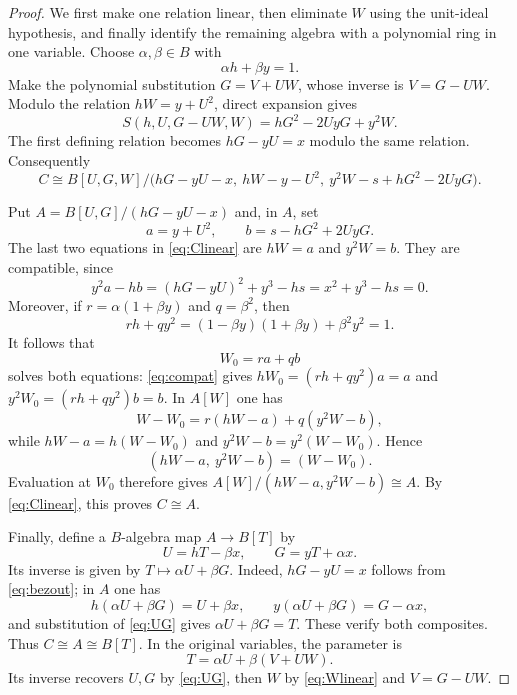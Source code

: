 \documentclass[11pt]{article}
\numberwithin{equation}{section}
\begin{document}
\begin{proof}
We first make one relation linear, then eliminate $W$ using the unit-ideal
hypothesis, and finally identify the remaining algebra with a polynomial ring
in one variable.
Choose $\alpha,\beta\in B$ with
\begin{equation}
  \alpha h+\beta y=1. \label{eq:bezout}
\end{equation}
Make the polynomial substitution $G=V+UW$, whose inverse is $V=G-UW$.
Modulo the relation $hW=y+U^2$, direct expansion gives
\[
  S(h,U,G-UW,W)=hG^2-2UyG+y^2W.
\]
The first defining relation becomes $hG-yU=x$ modulo the same relation.
Consequently
\begin{equation}
  C\cong B[U,G,W]/\bigl(hG-yU-x,\ hW-y-U^2,\
                       y^2W-s+hG^2-2UyG\bigr). \label{eq:Clinear}
\end{equation}

Put $A=B[U,G]/(hG-yU-x)$ and, in $A$, set
\[
  a=y+U^2,\qquad b=s-hG^2+2UyG.
\]
The last two equations in \eqref{eq:Clinear} are $hW=a$ and $y^2W=b$.
They are compatible, since
\begin{equation}
  y^2a-hb=(hG-yU)^2+y^3-hs=x^2+y^3-hs=0. \label{eq:compat}
\end{equation}
Moreover, if $r=\alpha(1+\beta y)$ and $q=\beta^2$, then
\[
  rh+qy^2=(1-\beta y)(1+\beta y)+\beta^2y^2=1.
\]
It follows that
\begin{equation}
  W_0=ra+qb \label{eq:Wlinear}
\end{equation}
solves both equations: \eqref{eq:compat} gives
$hW_0=(rh+qy^2)a=a$ and $y^2W_0=(rh+qy^2)b=b$.
In $A[W]$ one has
\[
  W-W_0=r(hW-a)+q(y^2W-b),
\]
while $hW-a=h(W-W_0)$ and $y^2W-b=y^2(W-W_0)$. Hence
\[
  (hW-a,\ y^2W-b)=(W-W_0).
\]
Evaluation at $W_0$ therefore gives
$A[W]/(hW-a,y^2W-b)\cong A$. By \eqref{eq:Clinear}, this proves $C\cong A$.

Finally, define a $B$-algebra map $A\to B[T]$ by
\begin{equation}
  U=hT-\beta x,\qquad G=yT+\alpha x. \label{eq:UG}
\end{equation}
Its inverse is given by
$T\mapsto\alpha U+\beta G$.
Indeed, $hG-yU=x$ follows from \eqref{eq:bezout}; in $A$ one has
\[
  h(\alpha U+\beta G)=U+\beta x,\qquad
  y(\alpha U+\beta G)=G-\alpha x,
\]
and substitution of \eqref{eq:UG} gives $\alpha U+\beta G=T$.
These verify both composites. Thus $C\cong A\cong B[T]$.
In the original variables, the parameter is
\[
  T=\alpha U+\beta(V+UW).
\]
Its inverse recovers $U,G$ by \eqref{eq:UG}, then $W$ by
\eqref{eq:Wlinear} and $V=G-UW$.
\end{proof}
\end{document}
